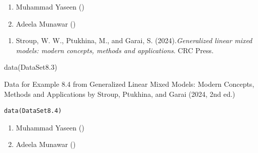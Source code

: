 \documentclass[a4paper]{book}
\begin{document}
%
\begin{Author}
\begin{enumerate}

\item{}  Muhammad Yaseen ()
\item{} Adeela Munawar ()

\end{enumerate}

\end{Author}
%
\begin{References}
\begin{enumerate}

\item{} Stroup, W. W., Ptukhina, M., and Garai, S. (2024).\emph{Generalized linear mixed models: modern concepts, methods and applications}.
CRC Press.

\end{enumerate}

\end{References}
%
\begin{SeeAlso}
\end{SeeAlso}
%
\begin{Examples}
\begin{ExampleCode}
data(DataSet8.3)
\end{ExampleCode}
\end{Examples}
%
\begin{Description}
Data for Example 8.4 from Generalized Linear Mixed Models: Modern Concepts, Methods and Applications by Stroup, Ptukhina, and Garai (2024, 2nd ed.)
\end{Description}
%
\begin{Usage}
\begin{verbatim}
data(DataSet8.4)
\end{verbatim}
\end{Usage}
%
\begin{Author}
\begin{enumerate}

\item{}  Muhammad Yaseen ()
\item{} Adeela Munawar ()

\end{enumerate}

\end{Author}
\end{document}
